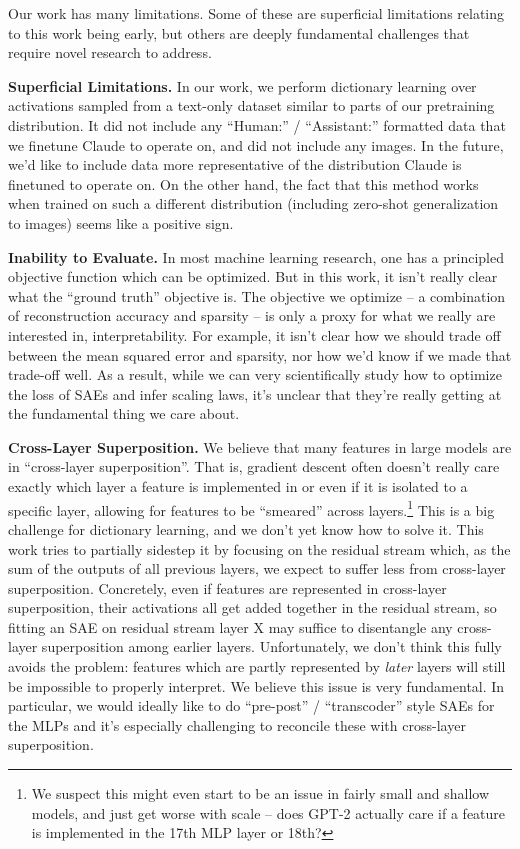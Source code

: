 \documentclass{article}
\begin{document}
Our work has many limitations. Some of these are superficial limitations relating to this work being early, but others are deeply fundamental challenges that require novel research to address.

\textbf{Superficial Limitations.} In our work, we perform dictionary learning over activations sampled from a text-only dataset similar to parts of our pretraining distribution. It did not include any “Human:” / “Assistant:” formatted data that we finetune Claude to operate on, and did not include any images. In the future, we'd like to include data more representative of the distribution Claude is finetuned to operate on. On the other hand, the fact that this method works when trained on such a different distribution (including zero-shot generalization to images) seems like a positive sign.

\textbf{Inability to Evaluate.} In most machine learning research, one has a principled objective function which can be optimized. But in this work, it isn't really clear what the “ground truth” objective is. The objective we optimize -- a combination of reconstruction accuracy and sparsity -- is only a proxy for what we really are interested in, interpretability. For example, it isn't clear how we should trade off between the mean squared error and sparsity, nor how we'd know if we made that trade-off well. As a result, while we can very scientifically study how to optimize the loss of SAEs and infer scaling laws, it's unclear that they're really getting at the fundamental thing we care about.

\textbf{Cross-Layer Superposition.} We believe that many features in large models are in “cross-layer superposition”. That is, gradient descent often doesn't really care exactly which layer a feature is implemented in or even if it is isolated to a specific layer, allowing for features to be “smeared” across layers.\footnote{We suspect this might even start to be an issue in fairly small and shallow models, and just get worse with scale -- does GPT-2 actually care if a feature is implemented in the 17th MLP layer or 18th?} This is a big challenge for dictionary learning, and we don’t yet know how to solve it. This work tries to partially sidestep it by focusing on the residual stream which, as the sum of the outputs of all previous layers, we expect to suffer less from cross-layer superposition. Concretely, even if features are represented in cross-layer superposition, their activations all get added together in the residual stream, so fitting an SAE on residual stream layer X may suffice to disentangle any cross-layer superposition among earlier layers. Unfortunately, we don't think this fully avoids the problem: features which are partly represented by \textit{later} layers will still be impossible to properly interpret. We believe this issue is very fundamental. In particular, we would ideally like to do “pre-post” / “transcoder” style SAEs \cite{templeton2024predicting,dunefsky2024transcoders,marks2024dictionary} for the MLPs and it's especially challenging to reconcile these with cross-layer superposition.
\end{document}
